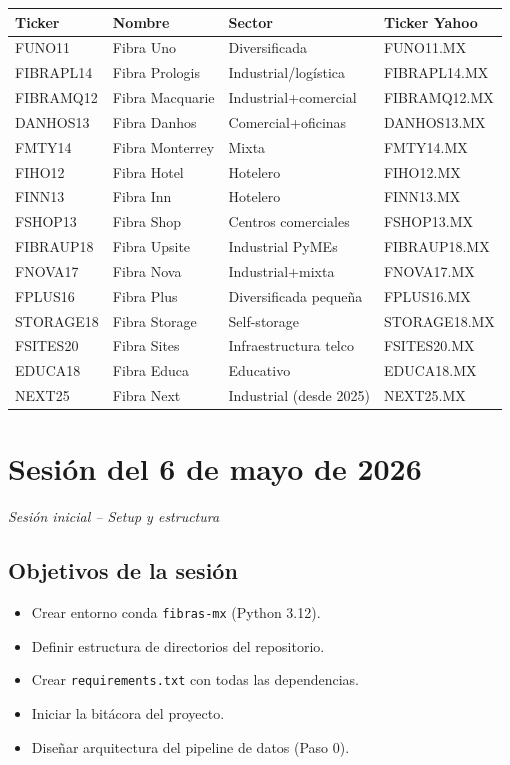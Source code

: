 \documentclass[12pt, a4paper]{article}
\newcommand{\sesion}[2]{%
  \section{Sesi\'{o}n del #1}%
  \textit{#2}%
  \vspace{0.5em}%
}
\begin{document}
\begin{center}
\begin{tabular}{llll}
  \toprule
  \textbf{Ticker} & \textbf{Nombre} & \textbf{Sector} & \textbf{Ticker Yahoo} \\
  \midrule
  FUNO11    & Fibra Uno       & Diversificada        & FUNO11.MX    \\
  FIBRAPL14 & Fibra Prologis  & Industrial/log\'{i}stica  & FIBRAPL14.MX \\
  FIBRAMQ12 & Fibra Macquarie & Industrial+comercial  & FIBRAMQ12.MX \\
  DANHOS13  & Fibra Danhos    & Comercial+oficinas   & DANHOS13.MX  \\
  FMTY14    & Fibra Monterrey & Mixta                & FMTY14.MX    \\
  FIHO12    & Fibra Hotel     & Hotelero             & FIHO12.MX    \\
  FINN13    & Fibra Inn       & Hotelero             & FINN13.MX    \\
  FSHOP13   & Fibra Shop      & Centros comerciales  & FSHOP13.MX   \\
  FIBRAUP18 & Fibra Upsite    & Industrial PyMEs     & FIBRAUP18.MX \\
  FNOVA17   & Fibra Nova      & Industrial+mixta     & FNOVA17.MX   \\
  FPLUS16   & Fibra Plus      & Diversificada peque\~{n}a & FPLUS16.MX   \\
  STORAGE18 & Fibra Storage   & Self-storage         & STORAGE18.MX \\
  FSITES20  & Fibra Sites     & Infraestructura telco & FSITES20.MX  \\
  EDUCA18   & Fibra Educa     & Educativo            & EDUCA18.MX   \\
  NEXT25    & Fibra Next      & Industrial (desde 2025) & NEXT25.MX \\
  \bottomrule
\end{tabular}
\end{center}

\newpage

\sesion{6 de mayo de 2026}{Sesi\'{o}n inicial -- Setup y estructura}

\subsection{Objetivos de la sesi\'{o}n}
\begin{itemize}
  \item Crear entorno conda \texttt{fibras-mx} (Python 3.12).
  \item Definir estructura de directorios del repositorio.
  \item Crear \texttt{requirements.txt} con todas las dependencias.
  \item Iniciar la bit\'{a}cora del proyecto.
  \item Dise\~{n}ar arquitectura del pipeline de datos (Paso 0).
\end{itemize}
\end{document}
